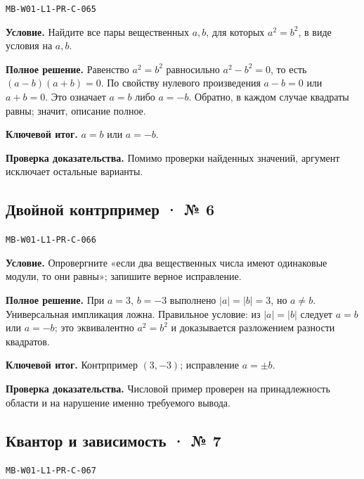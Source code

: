 \documentclass[11pt,a4paper,openany]{book}
\newcommand{\muid}[1]{\texttt{\footnotesize #1}}
\begin{document}
\muid{MB-W01-L1-PR-C-065}\par

\textbf{Условие.} Найдите все пары вещественных $a,b$, для которых $a^2=b^2$, в виде условия на $a,b$.\par

\textbf{Полное решение.} Равенство $a^2=b^2$ равносильно $a^2-b^2=0$, то есть $(a-b)(a+b)=0$. По свойству нулевого произведения $a-b=0$ или $a+b=0$. Это означает $a=b$ либо $a=-b$. Обратно, в каждом случае квадраты равны; значит, описание полное.


\begin{learnbox}\textbf{Ключевой итог.} $a=b$ или $a=-b$.\par \textbf{Проверка доказательства.} 
Помимо проверки найденных значений, аргумент исключает остальные варианты. 
\end{learnbox}

\subsection*{Двойной контрпример · № 6}\hypertarget{solution:MB-W01-L1-PR-C-066}{}

\muid{MB-W01-L1-PR-C-066}\par

\textbf{Условие.} Опровергните «если два вещественных числа имеют одинаковые модули, то они равны»; запишите верное исправление.\par

\textbf{Полное решение.} При $a=3$, $b=-3$ выполнено $|a|=|b|=3$, но $a\ne b$. Универсальная импликация ложна. Правильное условие: из $|a|=|b|$ следует $a=b$ или $a=-b$; это эквивалентно $a^2=b^2$ и доказывается разложением разности квадратов.


\begin{learnbox}\textbf{Ключевой итог.} Контрпример $(3,-3)$; исправление $a=\pm b$.\par \textbf{Проверка доказательства.} 
Числовой пример проверен на принадлежность области и на нарушение именно требуемого вывода. 
\end{learnbox}

\subsection*{Квантор и зависимость · № 7}\hypertarget{solution:MB-W01-L1-PR-C-067}{}

\muid{MB-W01-L1-PR-C-067}\par
\end{document}
